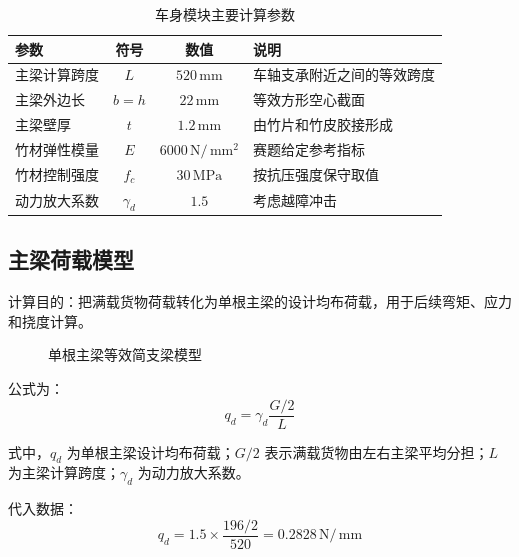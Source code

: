 \documentclass[UTF8,a4paper,12pt,fontset=none]{ctexart}
\numberwithin{equation}{section}
\numberwithin{figure}{section}
\numberwithin{table}{section}
\newcommand{\mm}{\,\mathrm{mm}}
\newcommand{\Nunit}{\,\mathrm{N}}
\newcommand{\MPa}{\,\mathrm{MPa}}
\begin{document}
\begin{table}[H]
\centering
\caption{车身模块主要计算参数}
\label{tab:body-params}
\begin{tabularx}{\linewidth}{l c c Y}
\toprule
参数 & 符号 & 数值 & 说明 \\
\midrule
主梁计算跨度 & $L$ & $520\mm$ & 车轴支承附近之间的等效跨度 \\
主梁外边长 & $b=h$ & $22\mm$ & 等效方形空心截面 \\
主梁壁厚 & $t$ & $1.2\mm$ & 由竹片和竹皮胶接形成 \\
竹材弹性模量 & $E$ & $6000\Nunit/\mm^2$ & 赛题给定参考指标 \\
竹材控制强度 & $f_c$ & $30\MPa$ & 按抗压强度保守取值 \\
动力放大系数 & $\gamma_d$ & $1.5$ & 考虑越障冲击 \\
\bottomrule
\end{tabularx}
\end{table}

\subsection{主梁荷载模型}
计算目的：把满载货物荷载转化为单根主梁的设计均布荷载，用于后续弯矩、应力和挠度计算。

\begin{figure}[H]
\centering
{}
\caption{单根主梁等效简支梁模型}
\label{fig:beam-model}
\end{figure}

公式为：
\begin{equation}
  q_d=\gamma_d\frac{G/2}{L}
\end{equation}

式中，$q_d$ 为单根主梁设计均布荷载；$G/2$ 表示满载货物由左右主梁平均分担；$L$ 为主梁计算跨度；$\gamma_d$ 为动力放大系数。

代入数据：
\begin{equation}
  q_d=1.5\times\frac{196/2}{520}=0.2828\Nunit/\mm
\end{equation}
\end{document}
